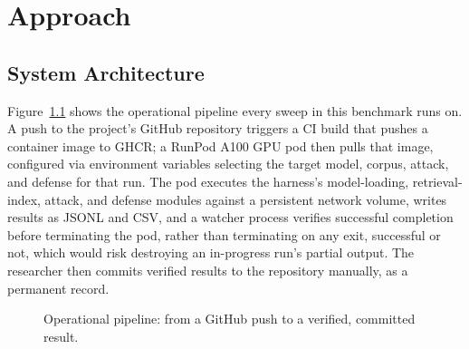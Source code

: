 \chapter{Approach}

\section{System Architecture}

Figure~\ref{fig:infra-pipeline} shows the operational pipeline every
sweep in this benchmark runs on. A push to the project's GitHub
repository triggers a CI build that pushes a container image to GHCR; a
RunPod A100 GPU pod then pulls that image, configured via environment
variables selecting the target model, corpus, attack, and defense for
that run. The pod executes the harness's model-loading, retrieval-index,
attack, and defense modules against a persistent network volume, writes
results as JSONL and CSV, and a watcher process verifies successful
completion before terminating the pod, rather than terminating on any
exit, successful or not, which would risk destroying an in-progress
run's partial output. The researcher then commits verified results to
the repository manually, as a permanent record.

\begin{figure}[htbp]
\centering
{}
\caption{Operational pipeline: from a GitHub push to a verified, committed result.}
\label{fig:infra-pipeline}
\end{figure}

